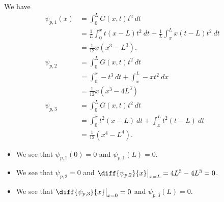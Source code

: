 \documentclass[10pt]{mypackage}
\begin{document}
\begin{solution}[42.2]
  We have
  \begin{align*}
    \psi_{p,1}(x) &= \int_{0}^{L} G\left( x,t \right)t^2\:dt\\
               &= \frac{1}{L}\int_{0}^{x} t\left( x-L \right)t^2\:dt + \frac{1}{L} \int_{x}^{L} x\left( t-L \right)t^2 \:dt\\
               &= \frac{1}{12}x\left( x^3-L^3 \right).\\
    \psi_{p,2} &= \int_{0}^{L} G\left( x,t \right)t^2\:dt\\
            &= \int_{0}^{x} -t^3\:dt + \int_{x}^{L} -xt^2\:dx\\
            &= \frac{1}{12}x\left( x^3-4L^3 \right)\\
    \psi_{p,3} &= \int_{0}^{L} G\left( x,t \right)t^2\:dt\\
            &= \int_{0}^{x} t^2\left( x-L \right)\:dt + \int_{x}^{L} t^2\left( t-L \right)\:dt\\
            &= \frac{1}{12}\left( x^4 - L^4 \right).
  \end{align*}
  \begin{itemize}
    \item We see that $\psi_{p,1}(0) = 0$ and $\psi_{p,1}(L) = 0$.
    \item We see that $\psi_{p,2} = 0$ and $\diff{\psi_{p,2}}{x}\bigr\vert_{x=L} = 4L^3-4L^3 = 0$.
    \item We see that $\diff{\psi_{p,3}}{x}\bigr\vert_{x=0} = 0$ and $\psi_{p,3}\left( L \right)=0$.
  \end{itemize}
\end{solution}
\end{document}
